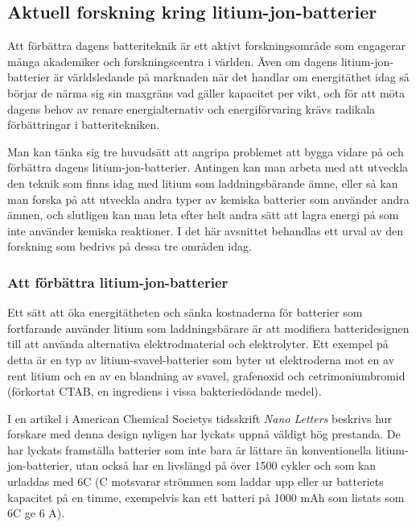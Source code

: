 \documentclass[a4paper,12pt]{article}
\begin{document}
\subsection{Aktuell forskning kring litium-jon-batterier}
Att förbättra dagens batteriteknik är ett aktivt forskningsområde som engagerar många akademiker och forskningscentra i världen. Även om dagens litium-jon-batterier är världsledande på marknaden när det handlar om energitäthet idag så börjar de närma sig sin maxgräns vad gäller kapacitet per vikt, och för att möta dagens behov av renare energialternativ och energiförvaring krävs radikala förbättringar i batteritekniken. \cite{better-battery} 

Man kan tänka sig tre huvudsätt att angripa problemet att bygga vidare på och förbättra dagens litium-jon-batterier. Antingen kan man arbeta med att utveckla den teknik som finns idag med litium som laddningsbärande ämne, eller så kan man forska på att utveckla andra typer av kemiska batterier som använder andra ämnen, och slutligen kan man leta efter helt andra sätt att lagra energi på som inte använder kemiska reaktioner. I det här avsnittet behandlas ett urval av den forskning som bedrivs på dessa tre områden idag.

\subsubsection{Att förbättra litium-jon-batterier}
Ett sätt att öka energitätheten och sänka kostnaderna för batterier som fortfarande använder litium som laddningsbärare är att modifiera batteridesignen till att använda alternativa elektrodmaterial och elektrolyter. Ett exempel på detta är en typ av litium-svavel-batterier som byter ut elektroderna mot en av rent litium och en av en blandning av svavel, grafenoxid och cetrimoniumbromid (förkortat CTAB, en ingrediens i vissa bakteriedödande medel).\cite{li-s}

I en artikel i American Chemical Societys tidsskrift \emph{Nano Letters} beskrivs hur forskare med denna design nyligen har lyckats uppnå väldigt hög prestanda. De har lyckats framställa batterier som inte bara är lättare än konventionella litium-jon-batterier, utan också har en livslängd på över 1500 cykler och som kan urladdas med 6C (C motsvarar strömmen som laddar upp eller ur batteriets kapacitet på en timme, exempelvis kan ett batteri på 1000 mAh som listats som 6C ge 6 A). \cite{li-s}
\end{document}
